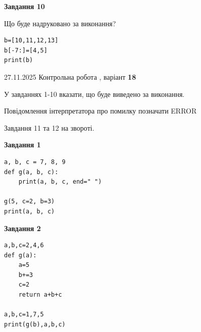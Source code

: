 \documentclass[12pt, ukrainian]{article}
\begin{document}
{{{{{{{{{{{{{{{{{{\begin{minipage}[t]{10.5cm}
\begin{center}
\textbf{Завдання 10}
\end{center}
Що буде надруковано за виконання?\par
\begin{verbatim}
b=[10,11,12,13]
b[-7:]=[4,5]
print(b)
\end{verbatim}

\end{minipage}

}
\newpage

{{ 27.11.2025 Контрольна робота , варіант  \No \textbf { 18 }\par}}
{

{%



У завданнях 1-10 вказати, що буде виведено за виконання.

Повідомлення інтерпретатора про помилку позначати ERROR

Завдання 11 та 12 на звороті.

\begin{minipage}[t]{7.5cm}

\begin{center}
\textbf{Завдання 1}
\end{center}

\begin{verbatim}
a, b, c = 7, 8, 9
def g(a, b, c):
    print(a, b, c, end=" ")

g(5, c=2, b=3)
print(a, b, c)
\end{verbatim}



\begin{center}
\textbf{Завдання 2}
\end{center}

\begin{verbatim}
a,b,c=2,4,6
def g(a):
    a=5
    b+=3
    c=2
    return a+b+c

a,b,c=1,7,5
print(g(b),a,b,c)
\end{verbatim}




\end{minipage}}}}}}}}}}}}}}}}}}}}
\end{document}
